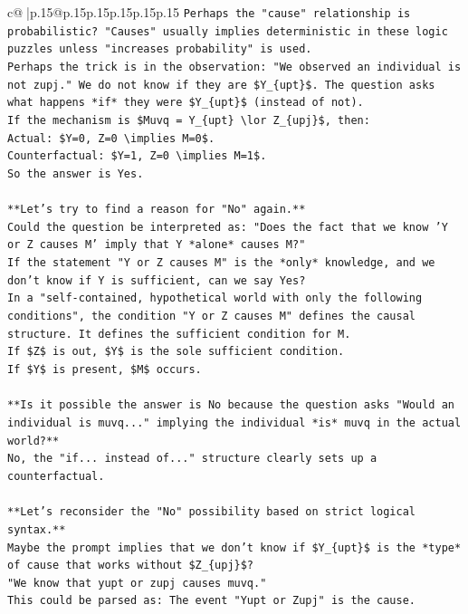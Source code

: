 \documentclass{article}
\begin{document}
{\begin{supertabular}{c@{$\;$}|p{.15\linewidth}@{}p{.15\linewidth}p{.15\linewidth}p{.15\linewidth}p{.15\linewidth}p{.15\linewidth}}
{{{\texttt{Perhaps the "cause" relationship is probabilistic? "Causes" usually implies deterministic in these logic puzzles unless "increases probability" is used.} \\
\texttt{Perhaps the trick is in the observation: "We observed an individual is not zupj." We do not know if they are \$Y\_\{upt\}\$. The question asks what happens *if* they were \$Y\_\{upt\}\$ (instead of not).} \\
\texttt{If the mechanism is \$Muvq = Y\_\{upt\} \textbackslash{}lor Z\_\{upj\}\$, then:} \\
\texttt{Actual: \$Y=0, Z=0 \textbackslash{}implies M=0\$.} \\
\texttt{Counterfactual: \$Y=1, Z=0 \textbackslash{}implies M=1\$.} \\
\texttt{So the answer is Yes.} \\
\\ 
\texttt{**Let's try to find a reason for "No" again.**} \\
\texttt{Could the question be interpreted as: "Does the fact that we know 'Y or Z causes M' imply that Y *alone* causes M?"} \\
\texttt{If the statement "Y or Z causes M" is the *only* knowledge, and we don't know if Y is sufficient, can we say Yes?} \\
\texttt{In a "self{-}contained, hypothetical world with only the following conditions", the condition "Y or Z causes M" defines the causal structure. It defines the sufficient condition for M.} \\
\texttt{If \$Z\$ is out, \$Y\$ is the sole sufficient condition.} \\
\texttt{If \$Y\$ is present, \$M\$ occurs.} \\
\\ 
\texttt{**Is it possible the answer is No because the question asks "Would an individual is muvq..." implying the individual *is* muvq in the actual world?**} \\
\texttt{No, the "if... instead of..." structure clearly sets up a counterfactual.} \\
\\ 
\texttt{**Let's reconsider the "No" possibility based on strict logical syntax.**} \\
\texttt{Maybe the prompt implies that we don't know if \$Y\_\{upt\}\$ is the *type* of cause that works without \$Z\_\{upj\}\$?} \\
\texttt{"We know that yupt or zupj causes muvq."} \\
\texttt{This could be parsed as: The event "Yupt or Zupj" is the cause.} \\
}}}
\end{supertabular}}
\end{document}
